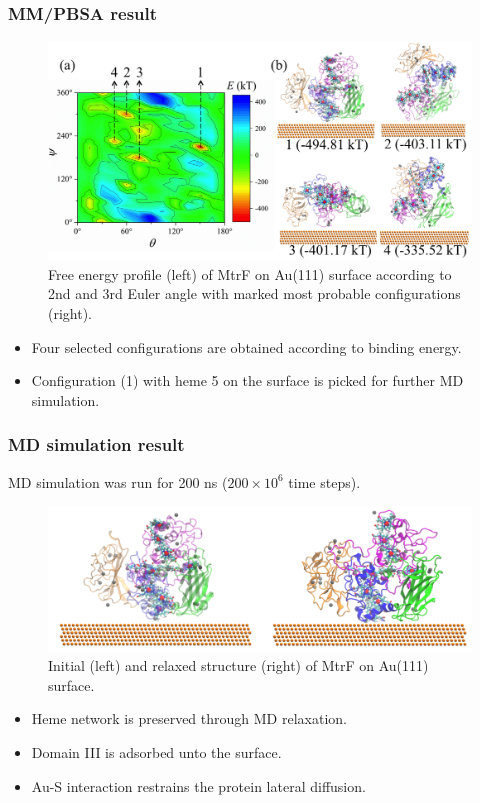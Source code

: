 \documentclass{beamer}
\begin{document}
\begin{frame}
\frametitle{MM/PBSA result}
\vspace{-.7cm}
\begin{figure}
	\includegraphics[width=.9\linewidth]{Pics/MtrF_MMPBSA.png} 
	\caption{Free energy profile (left) of MtrF on Au(111) surface according to 2nd and 3rd Euler angle with marked most probable configurations (right).}
\end{figure}
\begin{itemize}
	\item Four selected configurations are obtained according to binding energy. 
	\item Configuration (1) with heme 5 on the surface is picked for further MD simulation. 
\end{itemize}

\end{frame}

\begin{frame}
\frametitle{MD simulation result} 
MD simulation was run for 200 ns ($200 \times 10^6$ time steps). 
\begin{figure}
	\includegraphics[width=\linewidth]{Pics/MtrF_MD.png}
	\caption{Initial (left) and relaxed structure (right) of MtrF on Au(111) surface.}
\end{figure}
\begin{itemize}
	\item Heme network is preserved through MD relaxation. 
	\item Domain III is adsorbed unto the surface. 
	\item Au-S interaction restrains the protein lateral diffusion. 
\end{itemize}
\end{frame}
\end{document}
